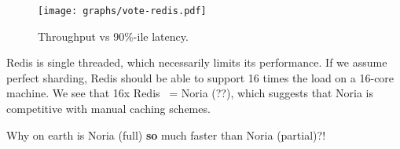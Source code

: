 \begin{figure}[h]
  \centering
  \texttt{[image: graphs/vote-redis.pdf]}
  \caption{Throughput vs 90\%-ile latency.}
  \label{f:vote-redis}
\end{figure}

Redis is single threaded, which necessarily limits its performance. If we assume
perfect sharding, Redis should be able to support 16 times the load on a 16-core
machine. We see that 16x Redis ~= Noria (??), which suggests that Noria is
competitive with manual caching schemes.

\begin{inprogress}
Why on earth is Noria (full) \textbf{so} much faster than Noria (partial)?!
\end{inprogress}
